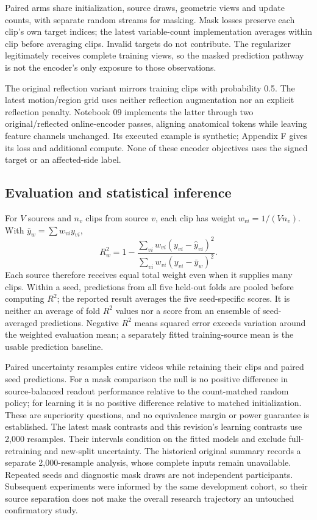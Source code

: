 \documentclass{article}
\begin{document}
Paired arms share initialization, source draws, geometric views and update counts, with separate random streams for masking. Mask losses preserve each clip's own target indices; the latest variable-count implementation averages within clip before averaging clips. Invalid targets do not contribute. The regularizer legitimately receives complete training views, so the masked prediction pathway is not the encoder's only exposure to those observations.

The original reflection variant mirrors training clips with probability 0.5. The latest motion/region grid uses neither reflection augmentation nor an explicit reflection penalty. Notebook 09 implements the latter through two original/reflected online-encoder passes, aligning anatomical tokens while leaving feature channels unchanged. Its executed example is synthetic; Appendix F gives its loss and additional compute. None of these encoder objectives uses the signed target or an affected-side label.

\subsection{Evaluation and statistical inference}\label{evaluation-and-statistical-inference}

For \(V\) sources and \(n_v\) clips from source \(v\), each clip has weight \(w_{vi}=1/(Vn_v)\). With \(\bar y_w=\sum w_{vi}y_{vi}\), \[
R^2_w=1-\frac{\sum_{vi}w_{vi}(y_{vi}-\hat y_{vi})^2}
{\sum_{vi}w_{vi}(y_{vi}-\bar y_w)^2}.
\] Each source therefore receives equal total weight even when it supplies many clips. Within a seed, predictions from all five held-out folds are pooled before computing \(R^2\); the reported result averages the five seed-specific scores. It is neither an average of fold \(R^2\) values nor a score from an ensemble of seed-averaged predictions. Negative \(R^2\) means squared error exceeds variation around the weighted evaluation mean; a separately fitted training-source mean is the usable prediction baseline.

Paired uncertainty resamples entire videos while retaining their clips and paired seed predictions. For a mask comparison the null is no positive difference in source-balanced readout performance relative to the count-matched random policy; for learning it is no positive difference relative to matched initialization. These are superiority questions, and no equivalence margin or power guarantee is established. The latest mask contrasts and this revision's learning contrasts use 2,000 resamples. Their intervals condition on the fitted models and exclude full-retraining and new-split uncertainty. The historical original summary records a separate 2,000-resample analysis, whose complete inputs remain unavailable. Repeated seeds and diagnostic mask draws are not independent participants. Subsequent experiments were informed by the same development cohort, so their source separation does not make the overall research trajectory an untouched confirmatory study.
\end{document}
